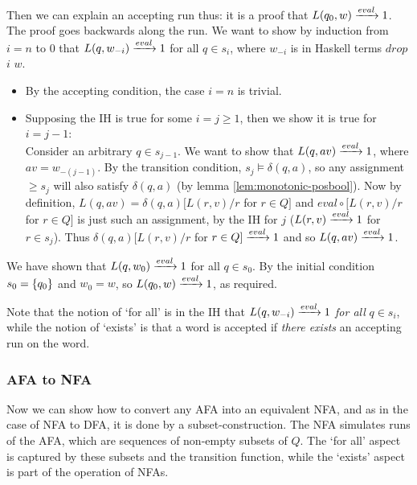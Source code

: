 Then we can explain an accepting run thus: it is a proof that $L(q_0,w) \xrightarrow{eval} 1$. The proof goes backwards along the run. We want to show by induction from $i=n$ to $0$ that $L(q,w_{-i}) \xrightarrow{eval} 1$ for all $q \in s_i$, where $w_{-i}$ is in Haskell terms $\mathit{drop}$ $i$ $w$. %
\begin{itemize}
\item By the accepting condition, the case $i=n$ is trivial.
\item Supposing the IH is true for some $i=j \geq 1$, then we show it is true for $i=j-1$:
\\ Consider an arbitrary $q \in s_{j-1}$. We want to show that $L(q,av) \xrightarrow{eval} 1 $, where $av = w_{-(j-1)}$. By the transition condition, $s_j \models \delta(q,a)$, so any assignment $\geq s_j$ will also satisfy $\delta(q,a)$ (by lemma \ref{lem:monotonic-posbool}). Now by definition, $L(q,av) = \delta(q, a)[L(r,v) / r$ for $r \in Q]$ and $eval \circ [L(r,v) / r$ for $r \in Q]$ is just such an assignment, by the IH for $j$ ($L(r,v) \xrightarrow{eval} 1$ for $r \in s_j$). Thus $\delta(q,a)[L(r,v) / r$ for $r \in Q] \xrightarrow{eval} 1$ and so $L(q,av) \xrightarrow{eval} 1$.

\end{itemize}

We have shown that $L(q,w_{0}) \xrightarrow{eval} 1 $ for all $q \in s_0$. By the initial condition $s_0 = \{q_0\}$ and $w_{0} = w$, so $L(q_0,w) \xrightarrow{eval} 1 $, as required.

Note that the notion of `for all' is in the IH that $L(q,w_{-i}) \xrightarrow{eval} 1$ \textit{for all} $q \in s_i$, while the notion of `exists' is that a word is accepted if \textit{there exists} an accepting run on the word.



\subsubsection{AFA to NFA}

Now we can show how to convert any AFA into an equivalent NFA, and as in the case of NFA to DFA, it is done by a subset-construction. The NFA simulates runs of the AFA, which are sequences of non-empty subsets of $Q$. The `for all' aspect is captured by these subsets and the transition function, while the `exists' aspect is part of the operation of NFAs.


